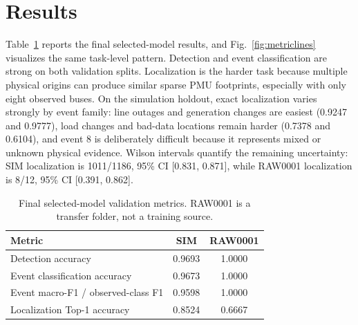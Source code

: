 \documentclass[conference]{IEEEtran}
\begin{document}
\section{Results}
\label{sec:results}
Table~\ref{tab:metrics} reports the final selected-model results, and Fig.~\ref{fig:metriclines} visualizes the same task-level pattern. Detection and event classification are strong on both validation splits. Localization is the harder task because multiple physical origins can produce similar sparse PMU footprints, especially with only eight observed buses. On the simulation holdout, exact localization varies strongly by event family: line outages and generation changes are easiest (0.9247 and 0.9777), load changes and bad-data locations remain harder (0.7378 and 0.6104), and event 8 is deliberately difficult because it represents mixed or unknown physical evidence. Wilson intervals quantify the remaining uncertainty: SIM localization is 1011/1186, 95\% CI [0.831, 0.871], while RAW0001 localization is 8/12, 95\% CI [0.391, 0.862].

\begin{table}[t]
\centering
\caption{Final selected-model validation metrics. RAW0001 is a transfer folder, not a training source.}
\label{tab:metrics}
\renewcommand{\arraystretch}{1.10}
\footnotesize
\begin{tabular}{@{}p{}cc@{}}
\toprule
\textbf{Metric} & \textbf{SIM} & \textbf{RAW0001} \\
\midrule
Detection accuracy & 0.9693 & 1.0000 \\
Event classification accuracy & 0.9673 & 1.0000 \\
Event macro-F1 / observed-class F1 & 0.9598 & 1.0000 \\
Localization Top-1 accuracy & 0.8524 & 0.6667 \\
\bottomrule
\end{tabular}
\end{table}
\end{document}
